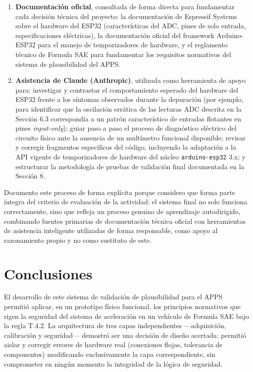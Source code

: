 \documentclass[12pt, letterpaper]{article}
\begin{document}
	\begin{enumerate}
		\item \textbf{Documentación oficial}, consultada de forma directa para fundamentar cada decisión técnica del proyecto: la documentación de Espressif Systems sobre el hardware del ESP32 (características del ADC, pines de solo entrada, especificaciones eléctricas), la documentación oficial del framework Arduino-ESP32 para el manejo de temporizadores de hardware, y el reglamento técnico de Formula SAE para fundamentar los requisitos normativos del sistema de plausibilidad del APPS.
		\item \textbf{Asistencia de Claude (Anthropic)}, utilizada como herramienta de apoyo para: investigar y contrastar el comportamiento esperado del hardware del ESP32 frente a los síntomas observados durante la depuración (por ejemplo, para identificar que la oscilación errática de las lecturas ADC descrita en la Sección 6.3 correspondía a un patrón característico de entradas flotantes en pines \textit{input-only}); guiar paso a paso el proceso de diagnóstico eléctrico del circuito físico ante la ausencia de un multímetro funcional disponible; revisar y corregir fragmentos específicos del código, incluyendo la adaptación a la API vigente de temporizadores de hardware del núcleo \texttt{arduino-esp32} 3.x; y estructurar la metodología de pruebas de validación final documentada en la Sección 8.
	\end{enumerate}
	
	Documento este proceso de forma explícita porque considero que forma parte íntegra del criterio de evaluación de la actividad: el sistema final no solo funciona correctamente, sino que refleja un proceso genuino de aprendizaje autodirigido, combinando fuentes primarias de documentación técnica oficial con herramientas de asistencia inteligente utilizadas de forma responsable, como apoyo al razonamiento propio y no como sustituto de este.
	
	\section{Conclusiones}
	El desarrollo de este sistema de validación de plausibilidad para el APPS permitió aplicar, en un prototipo físico funcional, los principios normativos que rigen la seguridad del sistema de aceleración en un vehículo de Formula SAE bajo la regla T.4.2. La arquitectura de tres capas independientes —adquisición, calibración y seguridad— demostró ser una decisión de diseño acertada: permitió aislar y corregir errores de hardware real (conexiones flojas, tolerancia de componentes) modificando exclusivamente la capa correspondiente, sin comprometer en ningún momento la integridad de la lógica de seguridad.
	
\end{document}
